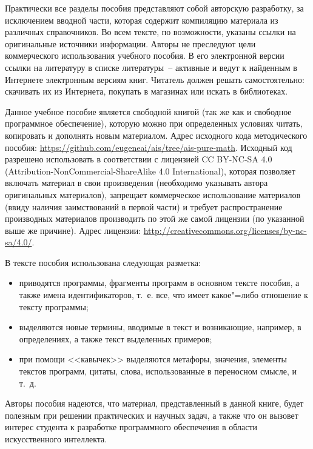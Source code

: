 \documentclass[a4paper,14pt, openany, twoside, final]{extbook} %
\begin{document}
Практически все разделы пособия представляют собой авторскую разработку, за исключением вводной части, которая содержит компиляцию материала из различных справочников.  Во всем тексте, по возможности, указаны ссылки на оригинальные источники информации.  Авторы не преследуют цели коммерческого использования учебного пособия.  В его электронной версии ссылки на литературу в списке литературы~-- активные и ведут к найденным в Интернете электронным версиям книг.  Читатель должен решать самостоятельно: скачивать их из Интернета, покупать в магазинах или искать в библиотеках.

Данное учебное пособие является свободной книгой (так же как и свободное программное обеспечение), которую можно при определенных условиях читать, копировать и дополнять новым материалом. Адрес исходного кода методического пособия: \url{https://github.com/eugeneai/ais/tree/ais-pure-math}. Исходный код разрешено использовать в соответствии с лицензией \foreignlanguage{english}{CC BY-NC-SA 4.0 (Attribution-NonCommercial-ShareAlike 4.0 International)}, которая позволяет включать материал в свои произведения (необходимо указывать автора оригинальных материалов), запрещает коммерческое использование материалов (ввиду наличия заимствований в первой части) и требует распространение производных материалов производить по этой же самой лицензии (по указанной выше же причине). Адрес лицензии: \url{http://creativecommons.org/licenses/by-nc-sa/4.0/}.

В тексте пособия использована следующая разметка:\enlargethispage{-2em}
\begin{itemize}[itemsep=0pt,parsep=0pt,topsep=0pt]
\item{} {} приводятся программы, фрагменты программ в основном тексте пособия, а также имена идентификаторов, т.~е. все, что имеет какое"=либо отношение к тексту программы;
\item{} {} выделяются новые термины, вводимые в текст и возникающие, например, в определениях, а также текст выделенных примеров;
\item{} {\normalfont при помощи <<кавычек>>} выделяются метафоры, значения, элементы текстов программ, цитаты, слова, использованные в переносном смысле, и т.~д.
\end{itemize}

Авторы пособия надеются, что материал, представленный в данной книге, будет полезным при решении практических и научных задач, а также что он вызовет интерес студента к разработке программного обеспечения в области искусственного интеллекта.
\end{document}
